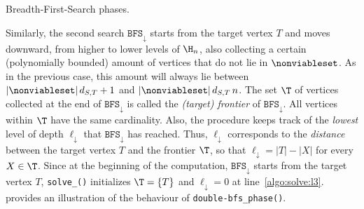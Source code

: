 \begin{algorithm}[t]
\caption{Breadth-First-Search phases.}\label{ALGO:double_bfs}
\DontPrintSemicolon
{}
\footnotesize
\nonl{}

\nonl{}

\setcounter{AlgoLine}{0}

\nonl{}
\end{algorithm}

Similarly, the second search $\texttt{BFS}_\downarrow$ starts from the target vertex $T$ and moves downward,
from higher to lower levels of $\H_n$, also collecting a certain (polynomially bounded) amount of vertices that do not lie in $\nonviableset$.
As in the previous case, this amount will always
lie between $|\nonviableset|\, d_{S,T} + 1$ and $|\nonviableset|\, d_{S,T}\, n$.
The set $\T$ of vertices collected at the end of $\texttt{BFS}_\downarrow$
is called the \emph{(target) frontier} of $\texttt{BFS}_\downarrow$.
All vertices within $\T$ have the same cardinality.
Also, the procedure keeps track of the \emph{lowest} level of depth $\ell_\downarrow$ that $\texttt{BFS}_\downarrow$ has reached.
Thus, $\ell_\downarrow$ corresponds to the \emph{distance} between the target vertex $T$ and the frontier $\T$,
so that $\ell_{\downarrow}=|T|-|X|$ for every $X\in\T$. Since at the beginning of the computation,
$\texttt{BFS}_\downarrow$ starts from the target vertex $T$,
\texttt{solve\_\mainproblem()} initializes $\T=\{T\}$ and $\ell_\downarrow=0$ at line~\ref{algo:solve:l3}.
 provides an illustration of the behaviour of \texttt{double-bfs\_phase()}.

